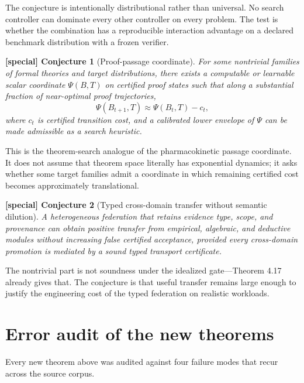 \documentclass[11pt]{article}
\theoremstyle{special}
\newtheorem{specialconj}{[special] Conjecture}[section]
\theoremstyle{definition}
\begin{document}
The conjecture is intentionally distributional rather than universal. No search controller can dominate every other controller on every problem. The test is whether the combination has a reproducible interaction advantage on a declared benchmark distribution with a frozen verifier.

\begin{specialconj}[Proof-passage coordinate]
For some nontrivial families of formal theories and target distributions, there exists a computable or learnable scalar coordinate $\Psi(B,T)$ on certified proof states such that along a substantial fraction of near-optimal proof trajectories,
\[
\Psi(B_{t+1},T)\approx \Psi(B_t,T)-c_t,
\]
where $c_t$ is certified transition cost, and a calibrated lower envelope of $\Psi$ can be made admissible as a search heuristic.
\end{specialconj}

This is the theorem-search analogue of the pharmacokinetic passage coordinate. It does not assume that theorem space literally has exponential dynamics; it asks whether some target families admit a coordinate in which remaining certified cost becomes approximately translational.

\begin{specialconj}[Typed cross-domain transfer without semantic dilution]
A heterogeneous federation that retains evidence type, scope, and provenance can obtain positive transfer from empirical, algebraic, and deductive modules without increasing false certified acceptance, provided every cross-domain promotion is mediated by a sound typed transport certificate.
\end{specialconj}

The nontrivial part is not soundness under the idealized gate---Theorem 4.17 already gives that. The conjecture is that useful transfer remains large enough to justify the engineering cost of the typed federation on realistic workloads.

\section{Error audit of the new theorems}

Every new theorem above was audited against four failure modes that recur across the source corpus.
\end{document}
